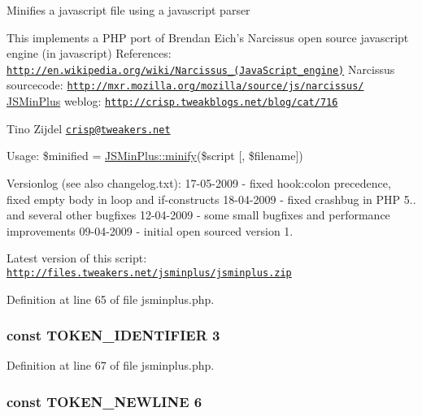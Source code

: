 Minifies a javascript file using a javascript parser

This implements a P\+H\+P port of Brendan Eich's Narcissus open source javascript engine (in javascript) References\+: \href{http://en.wikipedia.org/wiki/Narcissus_(JavaScript_engine)}{\tt http\+://en.\+wikipedia.\+org/wiki/\+Narcissus\+\_\+(\+Java\+Script\+\_\+engine)} Narcissus sourcecode\+: \href{http://mxr.mozilla.org/mozilla/source/js/narcissus/}{\tt http\+://mxr.\+mozilla.\+org/mozilla/source/js/narcissus/} \hyperlink{classJSMinPlus}{J\+S\+Min\+Plus} weblog\+: \href{http://crisp.tweakblogs.net/blog/cat/716}{\tt http\+://crisp.\+tweakblogs.\+net/blog/cat/716}

Tino Zijdel \href{mailto:crisp@tweakers.net}{\tt crisp@tweakers.\+net}

Usage\+: \$minified = \hyperlink{classJSMinPlus_a8b82317c1c24d13a8f01a4ee9b6ffb20}{J\+S\+Min\+Plus\+::minify}(\$script \mbox{[}, \$filename\mbox{]})

Versionlog (see also changelog.\+txt)\+: 17-\/05-\/2009 -\/ fixed hook\+:colon precedence, fixed empty body in loop and if-\/constructs 18-\/04-\/2009 -\/ fixed crashbug in P\+H\+P 5.. and several other bugfixes 12-\/04-\/2009 -\/ some small bugfixes and performance improvements 09-\/04-\/2009 -\/ initial open sourced version 1.

Latest version of this script\+: \href{http://files.tweakers.net/jsminplus/jsminplus.zip}{\tt http\+://files.\+tweakers.\+net/jsminplus/jsminplus.\+zip} 

Definition at line 65 of file jsminplus.\+php.

\hypertarget{jsminplus_8php_abec5059a97dfdbb70b92143ece0e6de7}{
\subsubsection[{T\+O\+K\+E\+N\+\_\+\+I\+D\+E\+N\+T\+I\+F\+I\+E\+R}]{\setlength{\rightskip}{0pt plus 5cm}const T\+O\+K\+E\+N\+\_\+\+I\+D\+E\+N\+T\+I\+F\+I\+E\+R 3}}\label{jsminplus_8php_abec5059a97dfdbb70b92143ece0e6de7}


Definition at line 67 of file jsminplus.\+php.

\hypertarget{jsminplus_8php_a1b58fc09d92bc692b3ffe3db71fe9c79}{
\subsubsection[{T\+O\+K\+E\+N\+\_\+\+N\+E\+W\+L\+I\+N\+E}]{\setlength{\rightskip}{0pt plus 5cm}const T\+O\+K\+E\+N\+\_\+\+N\+E\+W\+L\+I\+N\+E 6}}\label{jsminplus_8php_a1b58fc09d92bc692b3ffe3db71fe9c79}


